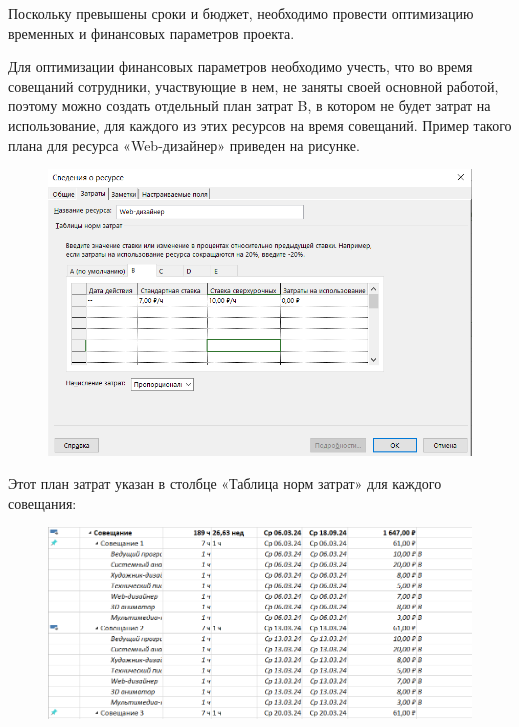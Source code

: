 Поскольку превышены сроки и бюджет, необходимо провести
оптимизацию временных и финансовых параметров проекта.

Для оптимизации финансовых параметров необходимо учесть, что во время совещаний сотрудники, участвующие в нем, не заняты своей основной работой, поэтому можно создать отдельный план затрат B, в котором не будет затрат на использование, для каждого из этих ресурсов на время совещаний. Пример такого плана для ресурса «Web-дизайнер» приведен на рисунке.

\begin{figure}[h!]
	\begin{center}
		\includegraphics[scale=0.6]{inc/img/p_11.png}
	\end{center}
	\captionsetup{justification=centering}
	\label{fig:u3}
\end{figure}

Этот план затрат указан в столбце «Таблица норм затрат» для каждого совещания:

\begin{figure}[h!]
	\begin{center}
		\includegraphics[scale=0.6]{inc/img/p_12.png}
	\end{center}
	\captionsetup{justification=centering}
	\label{fig:u3}
\end{figure}

